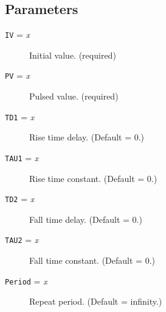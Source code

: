 \subsection{Parameters}

\begin{description}

\item[{\tt IV} = {\it x}] Initial value.  (required)

\item[{\tt PV} = {\it x}] Pulsed value.  (required)

\item[{\tt TD1} = {\it x}] Rise time delay.  (Default = 0.)

\item[{\tt TAU1} = {\it x}] Rise time constant.  (Default = 0.)

\item[{\tt TD2} = {\it x}] Fall time delay.  (Default = 0.)

\item[{\tt TAU2} = {\it x}] Fall time constant.  (Default = 0.)

\item[{\tt Period} = {\it x}] Repeat period.  (Default = infinity.)

\end{description}

